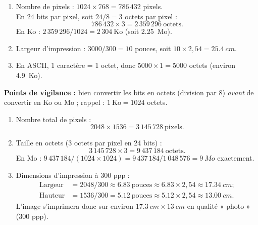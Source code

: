 \documentclass[11pt]{article}
\begin{document}
\begin{corrige}
\begin{enumerate}
  \item Nombre de pixels : $1024 \times 768 = 786\,432$ pixels.\\
  En 24 bits par pixel, soit $24 / 8 = 3$ octets par pixel :
  \[ 786\,432 \times 3 = 2\,359\,296~\text{octets}. \]
  En Ko : $2\,359\,296 / 1024 = 2\,304~\text{Ko}$ (soit \SI{2,25}{Mo}).
  \item Largeur d'impression : $3000 / 300 = 10$ pouces, soit $10 \times 2,54 = \SI{25,4}{cm}$.
  \item En ASCII, 1 caractère = 1 octet, donc $5000 \times 1 = 5000$ octets (environ \SI{4,9}{Ko}).
\end{enumerate}
\textbf{Points de vigilance :} bien convertir les bits en octets (division par 8) \emph{avant} de convertir en Ko ou Mo ; rappel : $1~\text{Ko} = 1024$ octets.
\end{corrige}

\begin{corrige}
\begin{enumerate}
  \item Nombre total de pixels :
  \[ 2048 \times 1536 = 3\,145\,728~\text{pixels}. \]
  \item Taille en octets (3 octets par pixel en 24 bits) :
  \[ 3\,145\,728 \times 3 = 9\,437\,184~\text{octets}. \]
  En Mo : $9\,437\,184 / (1024 \times 1024) = 9\,437\,184 / 1\,048\,576 = \SI{9}{Mo}$ exactement.
  \item Dimensions d'impression à 300 ppp :
  \begin{align*}
  \text{Largeur} &= 2048 / 300 \approx \num{6,83}~\text{pouces} \approx \num{6,83} \times 2,54 \approx \SI{17,34}{cm} ;\\
  \text{Hauteur} &= 1536 / 300 = \num{5,12}~\text{pouces} \approx \num{5,12} \times 2,54 \approx \SI{13,00}{cm}.
  \end{align*}
  L'image s'imprimera donc sur environ $\SI{17,3}{cm} \times \SI{13}{cm}$ en qualité « photo » (300 ppp).
\end{enumerate}
\end{corrige}
\end{document}
